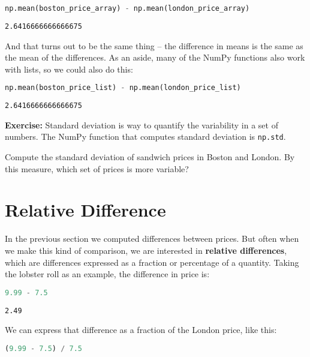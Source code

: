 \begin{lstlisting}[language=Python,style=source]
np.mean(boston_price_array) - np.mean(london_price_array)
\end{lstlisting}

\begin{lstlisting}[style=output]
2.6416666666666675
\end{lstlisting}

And that turns out to be the same thing -- the difference in means is
the same as the mean of the differences. As an aside, many of the NumPy
functions also work with lists, so we could also do this:

\begin{lstlisting}[language=Python,style=source]
np.mean(boston_price_list) - np.mean(london_price_list)
\end{lstlisting}

\begin{lstlisting}[style=output]
2.6416666666666675
\end{lstlisting}

\textbf{Exercise:} Standard deviation is way to quantify the variability
in a set of numbers. The NumPy function that computes standard deviation
is \passthrough{\lstinline!np.std!}.

Compute the standard deviation of sandwich prices in Boston and London.
By this measure, which set of prices is more variable?

\section{Relative Difference}\label{relative-difference}

In the previous section we computed differences between prices. But
often when we make this kind of comparison, we are interested in
\textbf{relative differences}, which are differences expressed as a
fraction or percentage of a quantity. Taking the lobster roll as an
example, the difference in price is:

\begin{lstlisting}[language=Python,style=source]
9.99 - 7.5
\end{lstlisting}

\begin{lstlisting}[style=output]
2.49
\end{lstlisting}

We can express that difference as a fraction of the London price, like
this:

\begin{lstlisting}[language=Python,style=source]
(9.99 - 7.5) / 7.5
\end{lstlisting}

